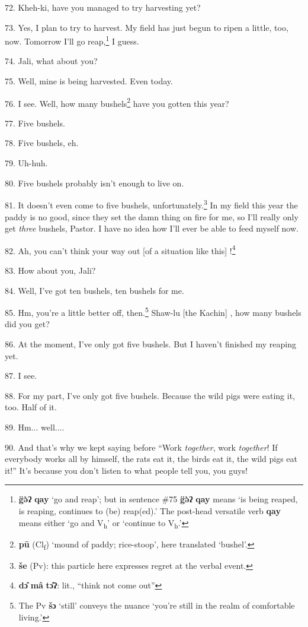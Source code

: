72. Kheh-ki, have you managed to try harvesting yet?

73. Yes, I plan to try to harvest. My field has just begun to ripen a little, too,
now. Tomorrow I'll go reap,\footnote{\textbf{g̈ə̀ʔ} \textbf{qay} `go and reap'; but in sentence \#75 \textbf{g̈ə̀ʔ} \textbf{qay} means `is being reaped, is reaping, continues to (be) reap(ed).' The post-head versatile verb \textbf{qay} means either `go and V\textsubscript{h}' or `continue to V\textsubscript{h}.'} I guess.

74. Jali, what about you?

75. Well, mine is being harvested. Even today.

76. I see. Well, how many bushels\footnote{\textbf{pū} (Cl\textsubscript{f}) `mound of paddy; rice-stoop', here translated `bushel'.} have you gotten this year?

77. Five bushels.

78. Five bushels, eh.

79. Uh-huh.

80. Five bushels probably isn't enough to live on.

81. It doesn't even come to five bushels, unfortunately.\footnote{\textbf{še} (Pv): this particle here expresses regret at the verbal event.} In my field this
year the paddy is no good, since they set the damn thing on fire for me, so I'll
really only get \textit{three} bushels, Pastor. I have no idea how I'll ever be
able to feed myself now.

82. Ah, you can't think your way out [of a situation like this] !\footnote{\textbf{dɔ̂} \textbf{mâ} \textbf{tɔ̂ʔ}: lit., ``think not come out''}

83. How about you, Jali?

84. Well, I've got ten bushels, ten bushels for me.

85. Hm, you're a little better off, then.\footnote{The Pv \textbf{šɔ} `still' conveys the nuance `you're still in the realm of comfortable living.'} Shaw-lu [the Kachin] , how many
bushels did you get?

86. At the moment, I've only got five bushels. But I haven't finished my reaping
yet.

87. I see.

88. For my part, I've only got five bushels. Because the wild pigs were eating
it, too. Half of it.

89. Hm... well....

90. And that's why we kept saying before ``Work\textit{ together}, work
\textit{together}! If everybody works all by himself, the rats eat it, the birds
eat it, the wild pigs eat it!'' It's because you don't listen to what people
tell you, you guys!

